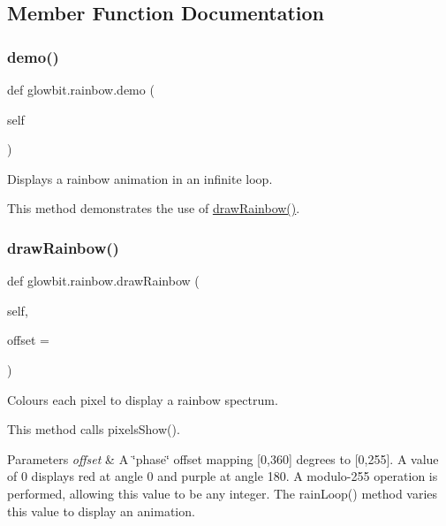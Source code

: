 \subsection{Member Function Documentation}
\mbox{\label{classglowbit_1_1rainbow_ae693f9ccb27c683ee6d69728e8f9266f}} 
\subsubsection{\texorpdfstring{demo()}{demo()}}
{\footnotesize\ttfamily def glowbit.\+rainbow.\+demo (\begin{DoxyParamCaption}\item[{}]{self }\end{DoxyParamCaption})}



Displays a rainbow animation in an infinite loop. 

This method demonstrates the use of \hyperlink{classglowbit_1_1rainbow_af03e480ce6a5d27780268b242a3fdfa7}{draw\+Rainbow()}. \mbox{\label{classglowbit_1_1rainbow_af03e480ce6a5d27780268b242a3fdfa7}} 
\subsubsection{\texorpdfstring{draw\+Rainbow()}{drawRainbow()}}
{\footnotesize\ttfamily def glowbit.\+rainbow.\+draw\+Rainbow (\begin{DoxyParamCaption}\item[{}]{self,  }\item[{}]{offset = {} }\end{DoxyParamCaption})}



Colours each pixel to display a rainbow spectrum. 

This method calls pixels\+Show().


\begin{DoxyParams}{Parameters}
{\em offset} & A \char`\"{}phase\char`\"{} offset mapping \mbox{[}0,360\mbox{]} degrees to \mbox{[}0,255\mbox{]}. A value of 0 displays red at angle 0 and purple at angle 180. A modulo-\/255 operation is performed, allowing this value to be any integer. The rain\+Loop() method varies this value to display an animation. \\
\hline
\end{DoxyParams}
\mbox{\label{classglowbit_1_1rainbow_a0940825ae934617f95b96e472923f07a}} 
